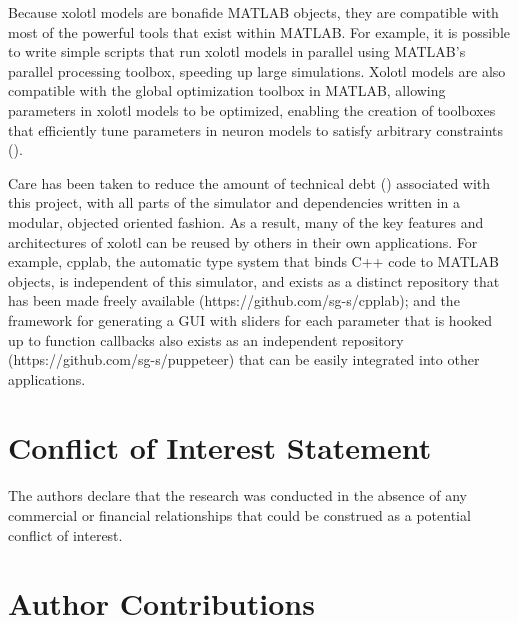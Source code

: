 \documentclass{frontiersSCNS} %
\begin{document}
Because xolotl models are bonafide MATLAB objects, they are compatible with most of the powerful tools that exist within MATLAB. For example, it is possible to write simple scripts that run xolotl models in parallel using MATLAB's parallel processing toolbox, speeding up large simulations. Xolotl models are also compatible with the global optimization toolbox in MATLAB, allowing parameters in xolotl models to be optimized, enabling the creation of toolboxes that efficiently tune parameters in neuron models to satisfy arbitrary constraints (\cite{Achard:2006ia, Krichmar:2014jj, Keren:2005ja, VanGeit:2007ea, Druckmann:2008kg}).  

Care has been taken to reduce the amount of technical debt (\cite{suryanarayana2014refactoring}) associated with this project, with all parts of the simulator and dependencies written in a modular, objected oriented fashion. As a result, many of the key features and architectures of xolotl can be reused by others in their own applications. For example, cpplab, the automatic type system that binds C++ code to MATLAB objects, is independent of this simulator, and exists as a distinct repository that has been made freely available (https://github.com/sg-s/cpplab); and the framework for generating a GUI with sliders for each parameter that is hooked up to function callbacks also exists as an independent repository (https://github.com/sg-s/puppeteer) that can be easily integrated into other applications. 


%
%
%
%
%
%

\section*{Conflict of Interest Statement}

The authors declare that the research was conducted in the absence of any commercial or financial relationships that could be construed as a potential conflict of interest.

\section*{Author Contributions}
\end{document}
